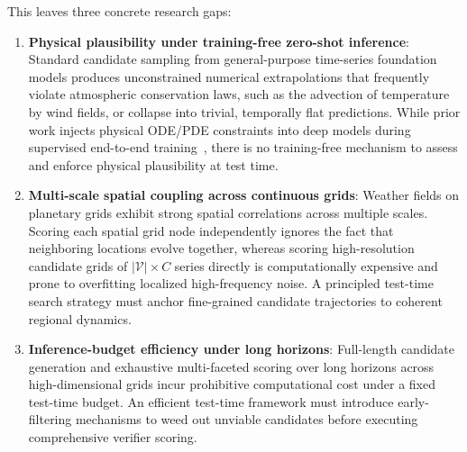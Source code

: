 \documentclass[preprint,12pt]{elsarticle}
\begin{document}
This leaves three concrete research gaps:
\begin{enumerate}
    \item \textbf{Physical plausibility under training-free zero-shot inference}: Standard candidate sampling from general-purpose time-series foundation models produces unconstrained numerical extrapolations that frequently violate atmospheric conservation laws, such as the advection of temperature by wind fields, or collapse into trivial, temporally flat predictions. While prior work injects physical ODE/PDE constraints into deep models during supervised end-to-end training~\citep{verma2024climode, park2025pint, xu2024weathergft}, there is no training-free mechanism to assess and enforce physical plausibility at test time.
    \item \textbf{Multi-scale spatial coupling across continuous grids}: Weather fields on planetary grids exhibit strong spatial correlations across multiple scales. Scoring each spatial grid node independently ignores the fact that neighboring locations evolve together, whereas scoring high-resolution candidate grids of $|\mathcal{V}| \times C$ series directly is computationally expensive and prone to overfitting localized high-frequency noise. A principled test-time search strategy must anchor fine-grained candidate trajectories to coherent regional dynamics.
    \item \textbf{Inference-budget efficiency under long horizons}: Full-length candidate generation and exhaustive multi-faceted scoring over long horizons across high-dimensional grids incur prohibitive computational cost under a fixed test-time budget. An efficient test-time framework must introduce early-filtering mechanisms to weed out unviable candidates before executing comprehensive verifier scoring.
\end{enumerate}
\end{document}
